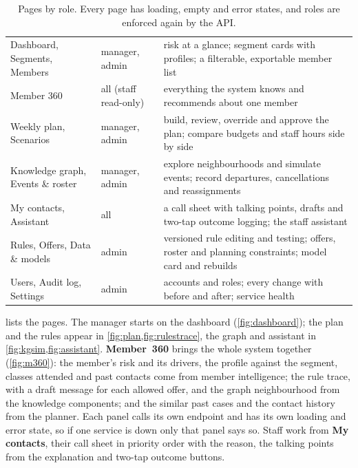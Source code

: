 \begin{table}[tb]
  \caption{Pages by role. Every page has loading, empty and error states, and roles are enforced again by the API.}
  \label{tab:pages}
  \begin{tabularx}{\linewidth}{@{}l l L@{}}
    \toprule
     &  &  \\
    \midrule
    Dashboard, Segments, Members & manager, admin & risk at a glance; segment cards with profiles; a filterable, exportable member list \\
    Member 360 & all (staff read-only) & everything the system knows and recommends about one member \\
    Weekly plan, Scenarios & manager, admin & build, review, override and approve the plan; compare budgets and staff hours side by side \\
    Knowledge graph, Events \& roster & manager, admin & explore neighbourhoods and simulate events; record departures, cancellations and reassignments \\
    My contacts, Assistant & all & a call sheet with talking points, drafts and two-tap outcome logging; the staff assistant \\
    Rules, Offers, Data \& models & admin & versioned rule editing and testing; offers, roster and planning constraints; model card and rebuilds \\
    Users, Audit log, Settings & admin & accounts and roles; every change with before and after; service health \\
    \bottomrule
  \end{tabularx}
\end{table}

 lists the pages. The manager starts on the dashboard (\cref{fig:dashboard}); the plan and the rules appear in \cref{fig:plan,fig:rulestrace}, the graph and assistant in \cref{fig:kgsim,fig:assistant}. \textbf{Member~360} brings the whole system together (\cref{fig:m360}): the member's risk and its drivers, the profile against the segment, classes attended and past contacts come from member intelligence; the rule trace, with a draft message for each allowed offer, and the graph neighbourhood from the knowledge components; and the similar past cases and the contact history from the planner. Each panel calls its own endpoint and has its own loading and error state, so if one service is down only that panel says so. Staff work from \textbf{My contacts}, their call sheet in priority order with the reason, the talking points from the explanation and two-tap outcome buttons.

